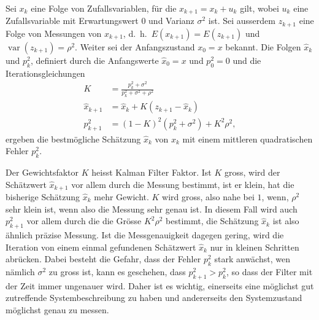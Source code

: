 \begin{satz}
Sei $x_k$ eine Folge von Zufallsvariablen, für die $x_{k+1}=x_k+u_k$ gilt, wobei
$u_k$ eine Zufallsvariable mit Erwartungswert $0$ und Varianz $\sigma^2$ ist.
Sei
ausserdem $z_{k+1}$ eine Folge von Messungen von $x_{k+1}$, d.~h.~$E(x_{k+1})=E(z_{k+1})$
und $\operatorname{var}(z_{k+1})=\rho^2$.
Weiter sei der Anfangszustand $x_0=x$ bekannt.
Die Folgen $\hat x_k$ und $p_k^2$, definiert durch die Anfangswerte
$\hat x_0=x$ und $p_0^2=0$ und die Iterationsgleichungen
\begin{align*}
K&=\frac{p_k^2+\sigma^2}{p_k^2+\sigma^2+\rho^2}\\
\hat x_{k+1}&=\hat x_k + K ( z_{k+1} - \hat x_k)\\
p_{k+1}^2&=(1-K)^2(p_k^2+\sigma^2)+K^2\rho^2,
\end{align*}
ergeben die bestmögliche Schätzung $\hat x_k$ von $x_k$ mit
einem mittleren quadratischen Fehler $p_k^2$.
\end{satz}
Der Gewichtsfaktor $K$ heisst Kalman Filter Faktor.
Ist $K$ gross, wird der
Schätzwert $\hat x_{k+1}$ vor allem durch die Messung bestimmt, ist er
klein, hat die bisherige Schätzung $\hat x_k$ mehr Gewicht.
$K$ wird gross,
also nahe bei $1$, wenn, $\rho^2$ sehr klein ist, wenn also die Messung
sehr genau ist.
In diesem Fall wird auch $p_{k+1}^2$ vor allem durch die
die Grösse $K^2\rho^2$ bestimmt, die Schätzung $\hat x_k$  ist also
ähnlich präzise Messung.
Ist die Messgenauigkeit dagegen gering,
wird die Iteration von einem einmal gefundenen Schätzwert $\hat x_k$
nur in kleinen Schritten abrücken.
Dabei besteht die Gefahr, dass
der Fehler $p_k^2$ stark anwächst, wen nämlich $\sigma^2$ zu gross
ist, kann es geschehen, dass $p_{k+1}^2>p_{k}^2$, so dass der Filter
mit der Zeit immer ungenauer wird.
Daher ist es wichtig, einerseits
eine möglichst gut zutreffende Systembeschreibung zu haben und andererseits
den Systemzustand möglichst genau zu messen.

